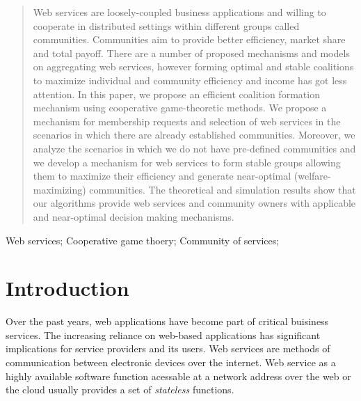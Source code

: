 \documentclass[10pt, conference, compsocconf]{IEEEtran}
\theoremstyle{plain}
\theoremstyle{definition}
\begin{document}
\maketitle


\begin{abstract}

Web services are loosely-coupled business applications and willing to cooperate in distributed settings within different groups called communities. Communities aim to provide better efficiency, market share and total payoff. There are a number of proposed mechanisms and models on aggregating web services, however forming optimal and stable coalitions to maximize individual and community efficiency and income has got less attention. In this paper, we propose an efficient coalition formation mechanism using cooperative game-theoretic methods. We propose a mechanism for membership requests and selection of web services in the scenarios in which there are already established communities. Moreover, we analyze the scenarios in which we do not have pre-defined communities and we develop a mechanism for web services to form stable groups allowing them to maximize their efficiency and generate near-optimal (welfare-maximizing) communities. The theoretical and simulation results show that our algorithms provide web services and community owners with applicable and near-optimal decision making mechanisms.

\end{abstract}

\begin{IEEEkeywords}
Web services; Cooperative game thoery; Community of services;

\end{IEEEkeywords}


%
\IEEEpeerreviewmaketitle

\section{Introduction}

Over the past years, web applications have become part of critical buisiness services. The increasing reliance on web-based applications has significant implications for service providers and its users. Web services are methods of communication between electronic devices over the internet. Web service as a highly available software function acessable at a network address over the web or the cloud usually provides a set of \emph{stateless} functions.  
\end{document}
